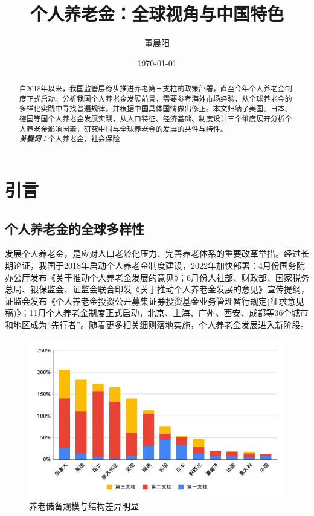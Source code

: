 \documentclass[a4paper,zihao=5]{ctexart}
\title{个人养老金：全球视角与中国特色}
\author{董晨阳}
\date{\today}
\providecommand{\keywords}[1]{\\\textbf{\textit{关键词：}}#1}
\begin{document}
\maketitle
\thispagestyle{empty}
\begin{abstract}
    自2018年以来，我国监管层稳步推进养老第三支柱的政策部署，直至今年个人养老金制度正式启动。分析我国个人养老金发展前景，需要参考海外市场经验，从全球养老金的多样化实践中寻找普遍规律，并根据中国具体国情做出修正。本文归纳了美国、日本、德国等国个人养老金发展实践，从人口特征、经济基础、制度设计三个维度展开分析个人养老金影响因素，研究中国与全球养老金的发展的共性与特性。
    \keywords{个人养老金，社会保险}
\end{abstract}
\setcounter{secnumdepth}{0}
\tableofcontents
\clearpage
\setcounter{page}{1}
\section{引言}
\subsection{个人养老金的全球多样性}
发展个人养老金，是应对人口老龄化压力、完善养老体系的重要改革举措。经过长期论证，我国于2018年启动个人养老金制度建设，2022年加快部署：4月份国务院办公厅发布《关于推动个人养老金发展的意见》；6月份人社部、财政部、国家税务总局、银保监会、证监会联合印发《关于推动个人养老金发展的意见》宣传提纲，证监会发布《个人养老金投资公开募集证券投资基金业务管理暂行规定(征求意见稿)》；11月个人养老金制度正式启动，北京、上海、广州、西安、成都等36个城市和地区成为“先行者”。随着更多相关细则落地实施，个人养老金发展进入新阶段。
\begin{figure}[H]
    \centering
    \includegraphics[width=\linewidth]{img/三支柱规模占GDP比重.png}
    \caption{养老储备规模与结构差异明显}
\end{figure}
\end{document}
